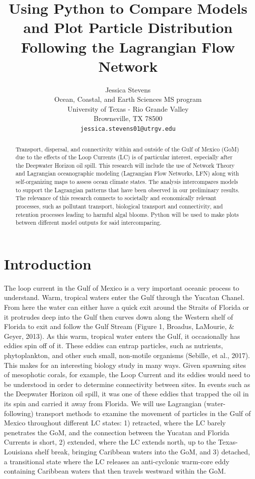\documentclass{article}
\title{Using Python to Compare Models and Plot Particle Distribution Following the Lagrangian Flow Network}
\author{
  Jessica Stevens \\
  Ocean, Coastal, and Earth Sciences MS program\\
  University of Texas - Rio Grande Valley\\
  Brownsville, TX 78500 \\
  \texttt{jessica.stevens01@utrgv.edu} \\
}
\begin{document}
\maketitle

\begin{abstract}
Transport, dispersal, and connectivity within and outside of the Gulf of Mexico (GoM) due to the effects of the Loop Currents (LC) is of particular interest, especially after the Deepwater Horizon oil spill. This research will include the use of Network Theory and Lagrangian oceanographic modeling (Lagrangian Flow Networks, LFN) along with self-organizing maps to assess ocean climate states. The analysis intercompares models to support the Lagrangian patterns that have been observed in our preliminary results. The relevance of this research connects to societally and economically relevant processes, such as pollutant transport, biological transport and connectivity, and retention processes leading to harmful algal blooms. Python will be used to make plots between different model outputs for said intercomparing. 
\end{abstract}




\section{Introduction}
\paragraph{} The loop current in the Gulf of Mexico is a very important oceanic process to understand. Warm, tropical waters enter the Gulf through the Yucatan Chanel. From here the water can either have a quick exit around the Straits of Florida or it protrudes deep into the Gulf then curves down along the Western shelf of Florida to exit and follow the Gulf Stream (Figure 1, Broadus, LaMourie, & Geyer, 2013). As this warm, tropical water enters the Gulf, it occasionally has eddies spin off of it. These eddies can entrap particles, such as nutrients, phytoplankton, and other such small, non-motile organisms (Sebille, et al., 2017). This makes for an interesting biology study in many ways. Given spawning sites of mesophotic corals, for example, the Loop Current and its eddies would need to be understood in order to determine connectivity between sites. In events such as the Deepwater Horizon oil spill, it was one of these eddies that trapped the oil in its spin and carried it away from Florida. We will use Lagrangian (water-following) transport methods to examine the movement of particles in the Gulf of Mexico throughout different LC states: 1) retracted, where the LC barely penetrates the GoM, and the connection between the Yucatan and Florida Currents is short, 2) extended, where the LC extends north, up to the Texas-Louisiana shelf break, bringing Caribbean waters into the GoM, and 3) detached, a transitional state where the LC releases an anti-cyclonic warm-core eddy containing Caribbean waters that then travels westward within the GoM.
\end{document}
